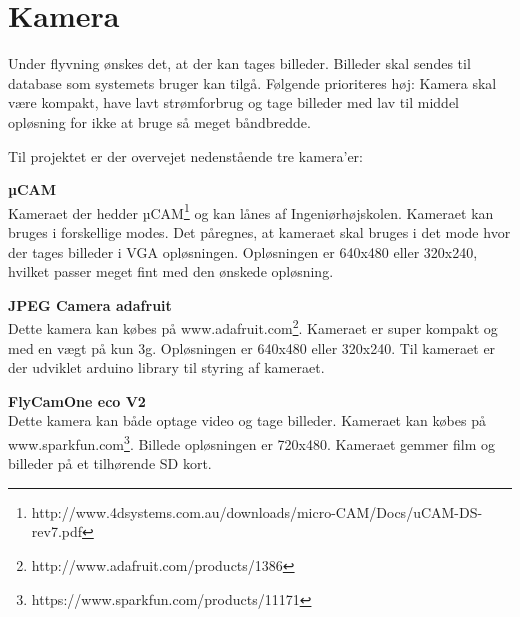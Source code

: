 \section{Kamera}

Under flyvning ønskes det, at der kan tages billeder. Billeder skal sendes til database som systemets bruger kan tilgå. Følgende prioriteres høj: Kamera skal være kompakt, have lavt strømforbrug og tage billeder med lav til middel opløsning for ikke at bruge så meget båndbredde. 

Til projektet er der overvejet nedenstående tre kamera'er:

\textbf{µCAM} \\
Kameraet der hedder µCAM\footnote{http://www.4dsystems.com.au/downloads/micro-CAM/Docs/uCAM-DS-rev7.pdf} og kan lånes af Ingeniørhøjskolen. Kameraet kan bruges i forskellige modes. Det påregnes, at kameraet skal bruges i det mode hvor der tages billeder i VGA opløsningen. Opløsningen er 640x480 eller 320x240, hvilket passer meget fint med den ønskede opløsning.

\textbf{JPEG Camera adafruit} \\
Dette kamera kan købes på www.adafruit.com\footnote{http://www.adafruit.com/products/1386}. Kameraet er super kompakt og med en vægt på kun 3g. Opløsningen er  640x480 eller 320x240. Til kameraet er der udviklet arduino library til styring af kameraet.

\textbf{FlyCamOne eco V2} \\
Dette kamera kan både optage video og tage billeder. Kameraet kan købes på www.sparkfun.com\footnote{https://www.sparkfun.com/products/11171}. Billede opløsningen er 720x480. Kameraet gemmer film og billeder på et tilhørende SD kort. 





